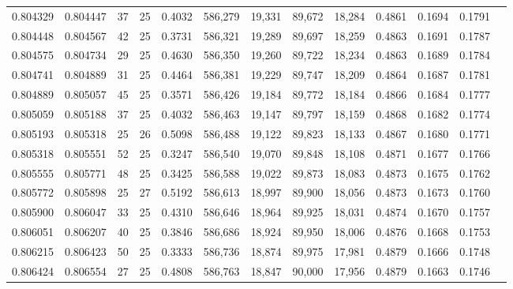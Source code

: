 \begin{tabular}{rrrrrrrrrrrrr}
0.804329 & 0.804447 &    37 &  25 &                                     0.4032 & 586,279 &  19,331 &  89,672 &  18,284 & 0.4861 & 0.1694 & 0.1791 \\
0.804448 & 0.804567 &    42 &  25 &                                     0.3731 & 586,321 &  19,289 &  89,697 &  18,259 & 0.4863 & 0.1691 & 0.1787 \\
0.804575 & 0.804734 &    29 &  25 &                                     0.4630 & 586,350 &  19,260 &  89,722 &  18,234 & 0.4863 & 0.1689 & 0.1784 \\
0.804741 & 0.804889 &    31 &  25 &                                     0.4464 & 586,381 &  19,229 &  89,747 &  18,209 & 0.4864 & 0.1687 & 0.1781 \\
0.804889 & 0.805057 &    45 &  25 &                                     0.3571 & 586,426 &  19,184 &  89,772 &  18,184 & 0.4866 & 0.1684 & 0.1777 \\
0.805059 & 0.805188 &    37 &  25 &                                     0.4032 & 586,463 &  19,147 &  89,797 &  18,159 & 0.4868 & 0.1682 & 0.1774 \\
0.805193 & 0.805318 &    25 &  26 &                                     0.5098 & 586,488 &  19,122 &  89,823 &  18,133 & 0.4867 & 0.1680 & 0.1771 \\
0.805318 & 0.805551 &    52 &  25 &                                     0.3247 & 586,540 &  19,070 &  89,848 &  18,108 & 0.4871 & 0.1677 & 0.1766 \\
0.805555 & 0.805771 &    48 &  25 &                                     0.3425 & 586,588 &  19,022 &  89,873 &  18,083 & 0.4873 & 0.1675 & 0.1762 \\
0.805772 & 0.805898 &    25 &  27 &                                     0.5192 & 586,613 &  18,997 &  89,900 &  18,056 & 0.4873 & 0.1673 & 0.1760 \\
0.805900 & 0.806047 &    33 &  25 &                                     0.4310 & 586,646 &  18,964 &  89,925 &  18,031 & 0.4874 & 0.1670 & 0.1757 \\
0.806051 & 0.806207 &    40 &  25 &                                     0.3846 & 586,686 &  18,924 &  89,950 &  18,006 & 0.4876 & 0.1668 & 0.1753 \\
0.806215 & 0.806423 &    50 &  25 &                                     0.3333 & 586,736 &  18,874 &  89,975 &  17,981 & 0.4879 & 0.1666 & 0.1748 \\
0.806424 & 0.806554 &    27 &  25 &                                     0.4808 & 586,763 &  18,847 &  90,000 &  17,956 & 0.4879 & 0.1663 & 0.1746 \\

\end{tabular}
